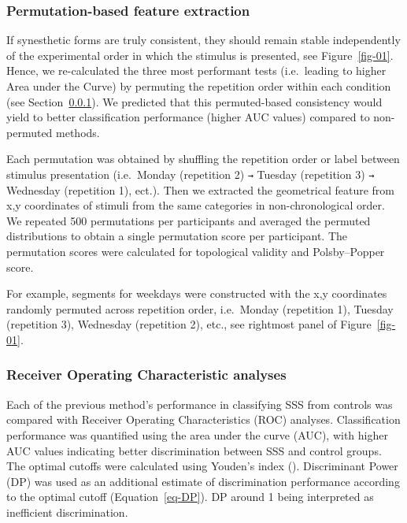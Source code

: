 \documentclass[
  man,
  floatsintext,
  longtable,
  a4paper,
  nolmodern,
  notxfonts,
  notimes,
  colorlinks=true,linkcolor=blue,citecolor=blue,urlcolor=blue]{apa7}
\begin{document}
\subsubsection{Permutation-based feature
extraction}\label{sec-permutation-based-feature-extraction}

If synesthetic forms are truly consistent, they should remain stable
independently of the experimental order in which the stimulus is
presented, see Figure~\ref{fig-01}. Hence, we re-calculated the three
most performant tests (i.e.~leading to higher Area under the Curve) by
permuting the repetition order within each condition (see
Section~\ref{sec-permutation-based-feature-extraction}). We predicted
that this permuted-based consistency would yield to better
classification performance (higher AUC values) compared to non-permuted
methods.

Each permutation was obtained by shuffling the repetition order or label
between stimulus presentation (i.e.~Monday (repetition 2) \texttt{→}
Tuesday (repetition 3) \texttt{→} Wednesday (repetition 1), ect.). Then
we extracted the geometrical feature from x,y coordinates of stimuli
from the same categories in non-chronological order. We repeated 500
permutations per participants and averaged the permuted distributions to
obtain a single permutation score per participant. The permutation
scores were calculated for topological validity and Polsby--Popper
score.

For example, segments for weekdays were constructed with the x,y
coordinates randomly permuted across repetition order, i.e.~Monday
(repetition 1), Tuesday (repetition 3), Wednesday (repetition 2), etc.,
see rightmost panel of Figure~\ref{fig-01}.

\subsubsection{Receiver Operating Characteristic
analyses}\label{sec-receiver-operating-characteristic-analyses}

Each of the previous method's performance in classifying SSS from
controls was compared with Receiver Operating Characteristics (ROC)
analyses. Classification performance was quantified using the area under
the curve (AUC), with higher AUC values indicating better discrimination
between SSS and control groups. The optimal cutoffs were calculated
using Youden's index ().
Discriminant Power (DP) was used as an additional estimate of
discrimination performance according to the optimal cutoff
(Equation~\ref{eq-DP}). DP around 1 being interpreted as inefficient
discrimination.
\end{document}
